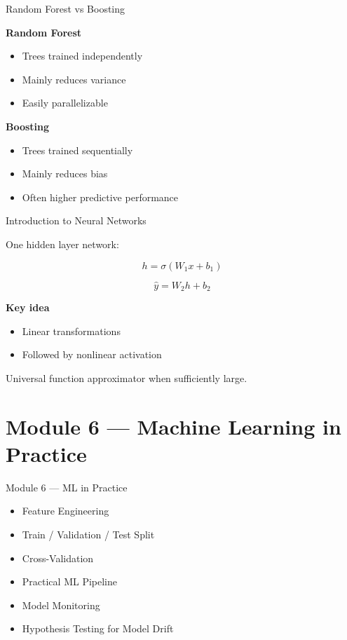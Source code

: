 \documentclass{beamer}
\begin{document}
\begin{frame}{Random Forest vs Boosting}

\textbf{Random Forest}

\begin{itemize}
    \item Trees trained independently
    \item Mainly reduces variance
    \item Easily parallelizable
\end{itemize}

\vspace{0.5cm}

\textbf{Boosting}

\begin{itemize}
    \item Trees trained sequentially
    \item Mainly reduces bias
    \item Often higher predictive performance
\end{itemize}

\end{frame}

\begin{frame}{Introduction to Neural Networks}

One hidden layer network:

\[
h = \sigma(W_1 x + b_1)
\]

\[
\hat{y} = W_2 h + b_2
\]

\vspace{0.4cm}

\textbf{Key idea}

\begin{itemize}
    \item Linear transformations
    \item Followed by nonlinear activation
\end{itemize}

\vspace{0.3cm}

Universal function approximator when sufficiently large.

\end{frame}


\section{Module 6 — Machine Learning in Practice}

\begin{frame}{Module 6 — ML in Practice}
\begin{itemize}
    \item Feature Engineering
    \item Train / Validation / Test Split
    \item Cross-Validation
    \item Practical ML Pipeline
    \item Model Monitoring
    \item Hypothesis Testing for Model Drift
\end{itemize}
\end{frame}
\end{document}
